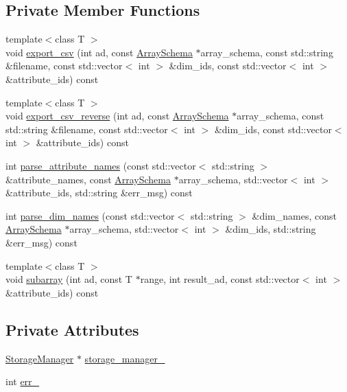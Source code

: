 \subsection*{Private Member Functions}
\begin{DoxyCompactItemize}
\item 
{\footnotesize template$<$class T $>$ }\\void \hyperlink{classQueryProcessor_ac47f5cc3f8ab2e025002a1dbcf07e736}{export\+\_\+csv} (int ad, const \hyperlink{classArraySchema}{Array\+Schema} $\ast$array\+\_\+schema, const std\+::string \&filename, const std\+::vector$<$ int $>$ \&dim\+\_\+ids, const std\+::vector$<$ int $>$ \&attribute\+\_\+ids) const 
\item 
{\footnotesize template$<$class T $>$ }\\void \hyperlink{classQueryProcessor_ac490bbe57b408f2b09b96232ff49b88c}{export\+\_\+csv\+\_\+reverse} (int ad, const \hyperlink{classArraySchema}{Array\+Schema} $\ast$array\+\_\+schema, const std\+::string \&filename, const std\+::vector$<$ int $>$ \&dim\+\_\+ids, const std\+::vector$<$ int $>$ \&attribute\+\_\+ids) const 
\item 
int \hyperlink{classQueryProcessor_a0ca14aca91dfa55c6acb82ed9f2c7e08}{parse\+\_\+attribute\+\_\+names} (const std\+::vector$<$ std\+::string $>$ \&attribute\+\_\+names, const \hyperlink{classArraySchema}{Array\+Schema} $\ast$array\+\_\+schema, std\+::vector$<$ int $>$ \&attribute\+\_\+ids, std\+::string \&err\+\_\+msg) const 
\item 
int \hyperlink{classQueryProcessor_a9dc7581a12ae6ab63518a372ec1702d8}{parse\+\_\+dim\+\_\+names} (const std\+::vector$<$ std\+::string $>$ \&dim\+\_\+names, const \hyperlink{classArraySchema}{Array\+Schema} $\ast$array\+\_\+schema, std\+::vector$<$ int $>$ \&dim\+\_\+ids, std\+::string \&err\+\_\+msg) const 
\item 
{\footnotesize template$<$class T $>$ }\\void \hyperlink{classQueryProcessor_a382d9d3f7639ba3594877872e0bbcd95}{subarray} (int ad, const T $\ast$range, int result\+\_\+ad, const std\+::vector$<$ int $>$ \&attribute\+\_\+ids) const 
\end{DoxyCompactItemize}
\subsection*{Private Attributes}
\begin{DoxyCompactItemize}
\item 
\hyperlink{classStorageManager}{Storage\+Manager} $\ast$ \hyperlink{classQueryProcessor_a3cc164cc6022e092ca7cc42d2be88aa7}{storage\+\_\+manager\+\_\+}
\item 
int \hyperlink{classQueryProcessor_ac62ff5cd45c6813c674f00d5f7c379fb}{err\+\_\+}
\end{DoxyCompactItemize}


